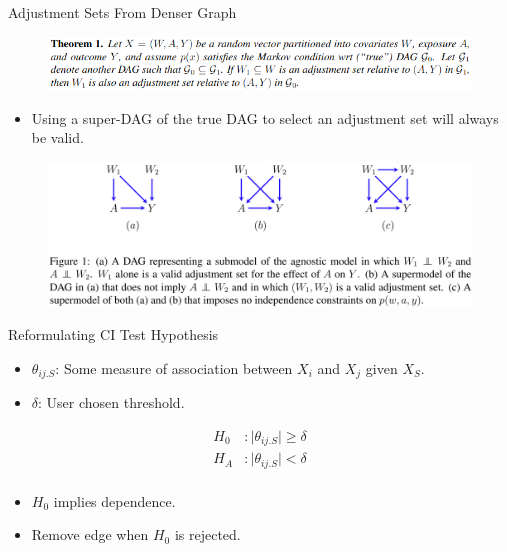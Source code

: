 \documentclass{beamer}
\begin{document}

\begin{frame}{Adjustment Sets From Denser Graph}
	\begin{figure}
		\centering
		\includegraphics[scale=0.4]{imgs/theorem1.png}
	\end{figure}
	\begin{itemize}
		\item Using a super-DAG of the true DAG to select an adjustment set will always be valid.
	\end{itemize}
	\vspace{1em}
	\begin{figure}
		\includegraphics[scale=0.15]{imgs/figure1.png}
	\end{figure}
\end{frame}

\begin{frame}{Reformulating CI Test Hypothesis}
	\begin{itemize}
		\item $ \theta_{ij.S} $: Some measure of association between $ X_i $ and $ X_j $ given $ X_S $.
		\item $ \delta $: User chosen threshold.
	\end{itemize}

	\begin{equation*}
		\begin{split}
			H_0&: \rvert \theta_{ij.S} \rvert \ge \delta \\
			H_A&: \rvert \theta_{ij.S} \rvert < \delta \\
		\end{split}
	\end{equation*}

	\begin{itemize}
		\item $ H_0 $ implies dependence.
		\item Remove edge when $ H_0 $ is rejected.
	\end{itemize}
\end{frame}
\end{document}
